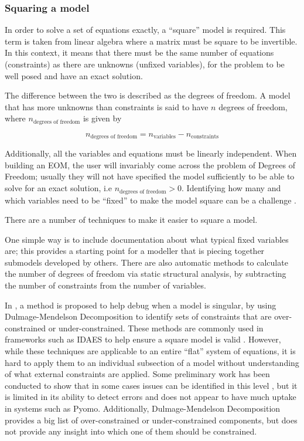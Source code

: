 \hypertarget{squaring-a-model}{%
\subsubsection{Squaring a model}\label{squaring-a-model}}

In order to solve a set of equations exactly, a ``square'' model is
required. This term is taken from linear algebra where a matrix must be
square to be invertible. In this context, it means that there must be
the same number of equations (constraints) as there are unknowns
(unfixed variables), for the problem to be well posed and have an exact
solution.

The difference between the two is described as the degrees of freedom. A
model that has more unknowns than constraints is said to have \(n\)
degrees of freedom, where \(n_{\text{degrees\ of\ freedom}}\) is given
by

\[
n_{\text{degrees\ of\ freedom}} =  n_{\text{variables}} - n_{\text{constraints}}
\]

Additionally, all the variables and equations must be linearly
independent. When building an EOM, the user will invariably come across
the problem of Degrees of Freedom; usually they will not have specified
the model sufficiently to be able to solve for an exact solution, i.e
\(n_{\text{degrees\ of\ freedom}} > 0\). Identifying how many and which
variables need to be ``fixed'' to make the model square can be a
challenge \citep{luyben1996design}.

There are a number of techniques to make it easier to square a model.

One simple way is to include documentation about what typical fixed
variables are; this provides a starting point for a modeller that is
piecing together submodels developed by others. There are also automatic
methods to calculate the number of degrees of freedom via static
structural analysis, by subtracting the number of constraints from the
number of variables.

In \citep{bunus2001debugging}, a method is proposed to help debug when a
model is singular, by using Dulmage-Mendelson Decomposition to identify
sets of constraints that are over-constrained or under-constrained.
These methods are commonly used in frameworks such as IDAES to help
ensure a square model is valid \citep{lee2024model}. However, while
these techniques are applicable to an entire ``flat'' system of
equations, it is hard to apply them to an individual subsection of a
model without understanding of what external constraints are applied.
Some preliminary work has been conducted to show that in some cases
issues can be identified in this level \citep{nilsson2008type}, but it
is limited in its ability to detect errors and does not appear to have
much uptake in systems such as Pyomo. Additionally, Dulmage-Mendelson
Decomposition provides a big list of over-constrained or
under-constrained components, but does not provide any insight into
which one of them should be constrained.

